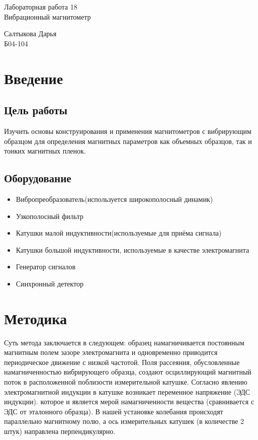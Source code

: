 \documentclass[a4paper,12pt]{article} %
\begin{document}
	
	
	\vspace{4.5cm}
	{\huge
		\begin{center}
			{Лабораторная работа 18}\\
			Вибрационный магнитометр
		\end{center}
	}
	\begin{flushright}
		{\LARGE Салтыкова Дарья \\
			\vspace{0.5cm}
			Б04-104}
	\end{flushright}
	


\section*{{Введение}}
\subsection*{{Цель работы}}

Изучить основы конструирования и применения магнитометров с вибрирующим образцом для определения магнитных параметров как объемных образцов, так и тонких магнитных пленок.



\subsection*{Оборудование}

\begin{itemize}
    \item Вибропреобразователь(используется широкополосный динамик)
    \item Узкополосный фильтр
    \item Катушки малой индуктивности(используемые для приёма сигнала)
    \item Катушки большой индуктивности, используемые в качестве электромагнита
    \item Генератор сигналов 
    \item Синхронный детектор
\end{itemize}

\section*{{Методика}}

	Суть метода заключается в следующем: образец намагничивается постоянным магнитным полем зазоре электромагнита и одновременно приводится периодическое движение с низкой частотой. Поля рассеяния, обусловленные намагниченностью вибрирующего образца, создают осциллирующий магнитный поток в расположенной поблизости измерительной катушке. Согласно явлению электромагнитной индукции в катушке возникает переменное напряжение (ЭДС индукции). которое и является мерой намагниченности вещества (сравнивается с ЭДС от эталонного образца).
В нашей установке колебания происходят параллельно магнитному полю, а ось измерительных катушек (в количестве 2 штук) направлена перпендикулярно. \\ 
\end{document}
